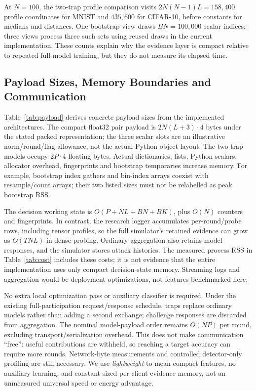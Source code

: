 \documentclass[conference]{IEEEtran}
\begin{document}
At $N=100$, the two-trap profile comparison visits
$2N(N-1)L=158{,}400$ profile coordinates for MNIST and $435{,}600$ for CIFAR-10,
before constants for medians and distances. One bootstrap view draws $BN=100{,}000$
scalar indices; three views process three such sets using reused draws in the
current implementation. These counts explain why the evidence layer is compact
relative to repeated full-model training, but they do not measure its elapsed time.

\subsection{Payload Sizes, Memory Boundaries and Communication}
Table~\ref{tab:payload} derives concrete payload sizes from the implemented
architectures. The compact float32 pair payload is
$2N(L+3)\cdot4$ bytes under the stated packed representation; the three scalar
slots are an illustrative norm/round/flag allowance, not the actual Python object
layout. The two trap models occupy $2P\cdot4$ floating bytes. Actual dictionaries,
lists, Python scalars, allocator overhead, fingerprints and bootstrap temporaries
increase memory. For example, bootstrap index gathers and bin-index arrays coexist
with resample/count arrays; their two listed sizes must not be relabelled as peak
bootstrap RSS.


The decision working state is $O(P+NL+BN+BK)$, plus $O(N)$ counters and
fingerprints. In contrast, the research logger accumulates per-round/probe rows,
including tensor profiles, so the full simulator's retained evidence can grow
as $O(TNL)$ in dense probing. Ordinary aggregation also retains model responses,
and the simulator stores attack histories. The measured process RSS in
Table~\ref{tab:cost} includes these costs; it is not evidence that the entire
implementation uses only compact decision-state memory. Streaming logs and
aggregation would be deployment optimizations, not features benchmarked here.

No extra local optimization pass or auxiliary classifier is required. Under the
existing full-participation request/response schedule, traps replace ordinary
models rather than adding a second exchange; challenge responses are discarded
from aggregation. The nominal model-payload order remains $O(NP)$ per round,
excluding transport/serialization overhead. This does not make communication
``free'': useful contributions are withheld, so reaching a target accuracy can
require more rounds. Network-byte measurements and controlled detector-only
profiling are still necessary. We use \emph{lightweight} to mean compact features,
no auxiliary learning, and constant-sized per-client evidence memory, not an
unmeasured universal speed or energy advantage.
\end{document}

